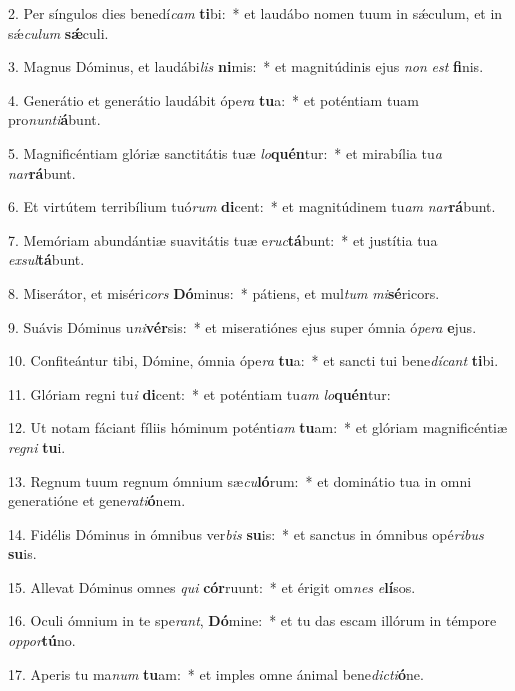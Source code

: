 2. Per síngulos dies benedí\textit{cam} \textbf{ti}bi:~* et laudábo nomen tuum in s\'{\ae}culum, et in s\'{\ae}\textit{cu}\textit{lum} \textbf{s\'{\ae}}culi.

3. Magnus Dóminus, et laudábi\textit{lis} \textbf{ni}mis:~* et magnitúdinis ejus \textit{non} \textit{est} \textbf{fi}nis.

4. Generátio et generátio laudábit ópe\textit{ra} \textbf{tu}a:~* et poténtiam tuam pro\textit{nun}\textit{ti}\textbf{á}bunt.

5. Magnificéntiam glóriæ sanctitátis tuæ \textit{lo}\textbf{quén}tur:~* et mirabília tu\textit{a} \textit{nar}\textbf{rá}bunt.

6. Et virtútem terribílium tuó\textit{rum} \textbf{di}cent:~* et magnitúdinem tu\textit{am} \textit{nar}\textbf{rá}bunt.

7. Memóriam abundántiæ suavitátis tuæ e\textit{ruc}\textbf{tá}bunt:~* et justítia tua \textit{ex}\textit{sul}\textbf{tá}bunt.

8. Miserátor, et miséri\textit{cors} \textbf{Dó}minus:~* pátiens, et mul\textit{tum} \textit{mi}\textbf{sé}ricors.

9. Suávis Dóminus u\textit{ni}\textbf{vér}sis:~* et miseratiónes ejus super ómnia ó\textit{pe}\textit{ra} \textbf{e}jus.

10. Confiteántur tibi, Dómine, ómnia ópe\textit{ra} \textbf{tu}a:~* et sancti tui bene\textit{dí}\textit{cant} \textbf{ti}bi.

11. Glóriam regni tu\textit{i} \textbf{di}cent:~* et poténtiam tu\textit{am} \textit{lo}\textbf{quén}tur:

12. Ut notam fáciant fíliis hóminum poténti\textit{am} \textbf{tu}am:~* et glóriam magnificéntiæ \textit{re}\textit{gni} \textbf{tu}i.

13. Regnum tuum regnum ómnium sæ\textit{cu}\textbf{ló}rum:~* et dominátio tua in omni generatióne et gene\textit{ra}\textit{ti}\textbf{ó}nem.

14. Fidélis Dóminus in ómnibus ver\textit{bis} \textbf{su}is:~* et sanctus in ómnibus opé\textit{ri}\textit{bus} \textbf{su}is.

15. Allevat Dóminus omnes \textit{qui} \textbf{cór}ruunt:~* et érigit om\textit{nes} \textit{e}\textbf{lí}sos.

16. Oculi ómnium in te spe\textit{rant}, \textbf{Dó}mine:~* et tu das escam illórum in témpore \textit{op}\textit{por}\textbf{tú}no.

17. Aperis tu ma\textit{num} \textbf{tu}am:~* et imples omne ánimal bene\textit{dic}\textit{ti}\textbf{ó}ne.

